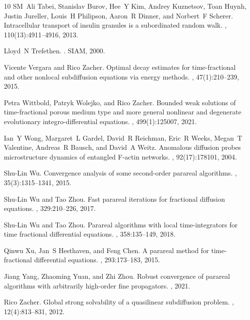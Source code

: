 \documentclass[12pt,a4paper]{article}
\begin{document}
\begin{thebibliography}{10}
	SM~Ali Tabei, Stanislav Burov, Hee~Y Kim, Andrey Kuznetsov, Toan Huynh, Justin
	Jureller, Louis~H Philipson, Aaron~R Dinner, and Norbert~F Scherer.
	\newblock Intracellular transport of insulin granules is a subordinated random
	walk.
	,
	110(13):4911--4916, 2013.
	
	Lloyd~N Trefethen.
	.
	\newblock SIAM, 2000.
	
	Vicente Vergara and Rico Zacher.
	\newblock Optimal decay estimates for time-fractional and other nonlocal
	subdiffusion equations via energy methods.
	, 47(1):210--239, 2015.
	
	Petra Wittbold, Patryk Wolejko, and Rico Zacher.
	\newblock Bounded weak solutions of time-fractional porous medium type and more
	general nonlinear and degenerate evolutionary integro-differential equations.
	,
	499(1):125007, 2021.
	
	Ian~Y Wong, Margaret~L Gardel, David~R Reichman, Eric~R Weeks, Megan~T
	Valentine, Andreas~R Bausch, and David~A Weitz.
	\newblock Anomalous diffusion probes microstructure dynamics of entangled
	{F-actin} networks.
	, 92(17):178101, 2004.
	
	Shu-Lin Wu.
	\newblock Convergence analysis of some second-order parareal algorithms.
	, 35(3):1315--1341, 2015.
	
	Shu-Lin Wu and Tao Zhou.
	\newblock Fast parareal iterations for fractional diffusion equations.
	, 329:210--226, 2017.
	
	Shu-Lin Wu and Tao Zhou.
	\newblock Parareal algorithms with local time-integrators for time fractional
	differential equations.
	, 358:135--149, 2018.
	
	Qinwu Xu, Jan~S Hesthaven, and Feng Chen.
	\newblock A parareal method for time-fractional differential equations.
	, 293:173--183, 2015.
	
	Jiang Yang, Zhaoming Yuan, and Zhi Zhou.
	\newblock Robust convergence of parareal algorithms with arbitrarily high-order
	fine propagators.
	, 2021.
	
	Rico Zacher.
	\newblock Global strong solvability of a quasilinear subdiffusion problem.
	, 12(4):813--831, 2012.
	
\end{thebibliography}
\end{document}
